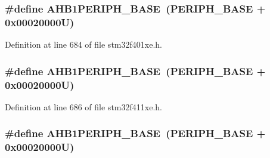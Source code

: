 \subsubsection[{\texorpdfstring{A\+H\+B1\+P\+E\+R\+I\+P\+H\+\_\+\+B\+A\+SE}{AHB1PERIPH_BASE}}]{\setlength{\rightskip}{0pt plus 5cm}\#define A\+H\+B1\+P\+E\+R\+I\+P\+H\+\_\+\+B\+A\+SE~({\bf P\+E\+R\+I\+P\+H\+\_\+\+B\+A\+SE} + 0x00020000\+U)}\hypertarget{group___peripheral__registers__structures_ga811a9a4ca17f0a50354a9169541d56c4}{}\label{group___peripheral__registers__structures_ga811a9a4ca17f0a50354a9169541d56c4}


Definition at line 684 of file stm32f401xe.\+h.

\subsubsection[{\texorpdfstring{A\+H\+B1\+P\+E\+R\+I\+P\+H\+\_\+\+B\+A\+SE}{AHB1PERIPH_BASE}}]{\setlength{\rightskip}{0pt plus 5cm}\#define A\+H\+B1\+P\+E\+R\+I\+P\+H\+\_\+\+B\+A\+SE~({\bf P\+E\+R\+I\+P\+H\+\_\+\+B\+A\+SE} + 0x00020000\+U)}\hypertarget{group___peripheral__registers__structures_ga811a9a4ca17f0a50354a9169541d56c4}{}\label{group___peripheral__registers__structures_ga811a9a4ca17f0a50354a9169541d56c4}


Definition at line 686 of file stm32f411xe.\+h.

\subsubsection[{\texorpdfstring{A\+H\+B1\+P\+E\+R\+I\+P\+H\+\_\+\+B\+A\+SE}{AHB1PERIPH_BASE}}]{\setlength{\rightskip}{0pt plus 5cm}\#define A\+H\+B1\+P\+E\+R\+I\+P\+H\+\_\+\+B\+A\+SE~({\bf P\+E\+R\+I\+P\+H\+\_\+\+B\+A\+SE} + 0x00020000\+U)}\hypertarget{group___peripheral__registers__structures_ga811a9a4ca17f0a50354a9169541d56c4}{}\label{group___peripheral__registers__structures_ga811a9a4ca17f0a50354a9169541d56c4}


